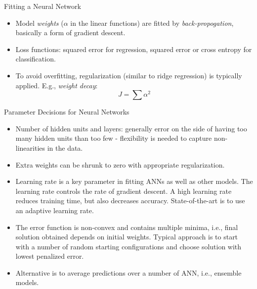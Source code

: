 \documentclass{beamer}
\begin{document}
\begin{frame}{Fitting a Neural Network}
    \begin{itemize}
        \item Model \textit{weights} ($\alpha$ in the linear functions) are fitted by \textit{back-propogation}, basically a form of gradient descent.
        \item Loss functions: squared error for regression, squared error or cross entropy for classification.
        \item To avoid overfitting, regularization (similar to ridge regression) is typically applied. E.g., \textit{weight decay}:
        \begin{equation*}
            J = \sum \alpha^2
        \end{equation*}
    \end{itemize}
\end{frame}


\begin{frame}{Parameter Decisions for Neural Networks}
    \begin{itemize}
        \item Number of hidden units and layers: generally error on the side of having too many hidden units than too few - flexibility is needed to capture non-linearities in the data.
        \item Extra weights can be shrunk to zero with appropriate regularization.
        \item Learning rate is a key parameter in fitting ANNs as well as other models. The learning rate controls the rate of gradient descent. A high learning rate reduces training time, but also decreases accuracy. State-of-the-art is to use an adaptive learning rate. 
        \item The error function is non-convex and contains multiple minima, i.e., final solution obtained depends on initial weights. Typical approach is to start with a number of random starting configurations and choose solution with lowest penalized error.
        \item Alternative is to average predictions over a number of ANN, i.e., ensemble models.
    \end{itemize}
\end{frame}
\end{document}

